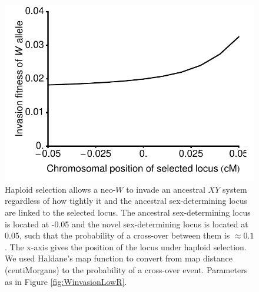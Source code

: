 \documentclass[12pt]{article}
\begin{document}
\begin{figure}
\centering
\includegraphics[width=0.5\linewidth]{InvasionVsCentiMorgans}
\caption{
Haploid selection allows a neo-$W$ to invade an ancestral $XY$ system regardless of how tightly it and the ancestral sex-determining locus are linked to the selected locus. 
The ancestral sex-determining locus is located at -0.05 and the novel sex-determining locus is located at 0.05, such that the probability of a cross-over between them is $\approx0.1$.
The x-axis gives the position of the locus under haploid selection.
We used Haldane's map function \citep[Equation 3 in ][]{Haldane1919} to convert from map distance (centiMorgans) to the probability of a cross-over event. 
Parameters as in Figure \ref{fig:WinvasionLowR}.
}
\label{fig:InvasionVsCentiMorgans}
\end{figure}
\end{document}
